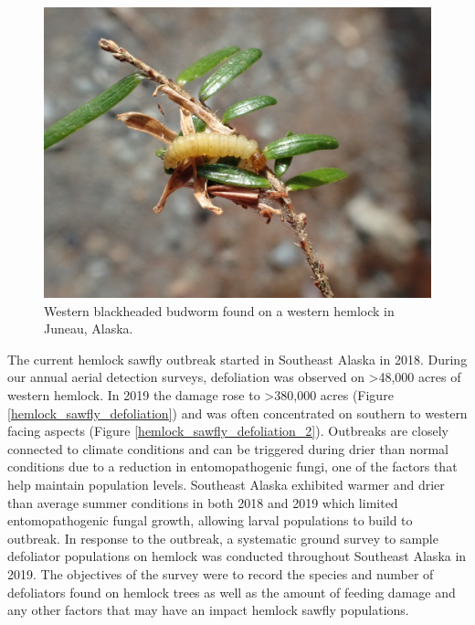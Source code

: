 \begin{multicols}{2} 

\begin{figure}[H]
\begin{center}
\vspace{2mm}
\includegraphics[width=\textwidth]{img/western_blackheaded_budworm_larva.jpg}
\caption{Western blackheaded budworm found on a western hemlock in Juneau, Alaska.}
\label{western_blackheaded_budworm_larva}
\end{center}
\end{figure} 

The current hemlock sawfly outbreak started in Southeast Alaska in 2018.  During our annual aerial detection surveys, defoliation was observed on >48,000 acres of western hemlock.  In 2019 the damage rose to >380,000 acres (Figure \ref{hemlock_sawfly_defoliation}) and was often concentrated on southern to western facing aspects (Figure \ref{hemlock_sawfly_defoliation_2}). Outbreaks are closely connected to climate conditions and can be triggered during drier than normal conditions due to a reduction in entomopathogenic fungi, one of the factors that help maintain population levels.   Southeast Alaska exhibited warmer and drier than average summer conditions in both 2018 and 2019 which limited entomopathogenic fungal growth, allowing larval populations to build to outbreak. In response to the outbreak, a systematic ground survey to sample defoliator populations on hemlock was conducted throughout Southeast Alaska in 2019.  The objectives of the survey were to record the species and number of defoliators found on hemlock trees as well as the amount of feeding damage and any other factors that may have an impact hemlock sawfly populations.


\end{multicols}
